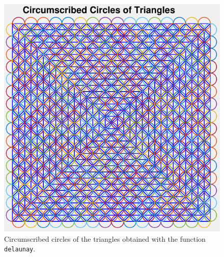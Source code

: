 \documentclass[11pt,a4paper,center,notitlepage]{article}
\numberwithin{equation}{section}
\begin{document}
\begin{figure}[H]
\centering
\includegraphics[scale=0.6]{13}
\caption{Circumscribed circles of the triangles obtained with the function \texttt{delaunay}.}
\label{fig13}
\end{figure}
\end{document}

